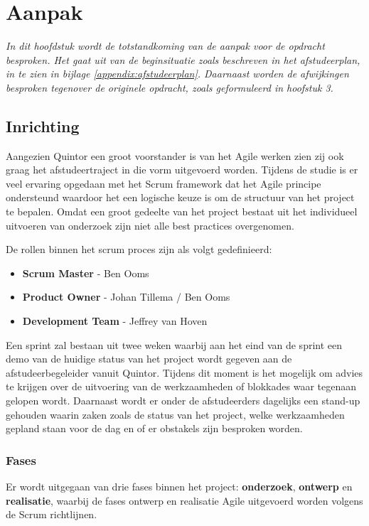 \chapter{Aanpak}
\label{Aanpak}

\textit{In dit hoofdstuk wordt de totstandkoming van de aanpak voor de opdracht besproken. Het gaat uit van de beginsituatie zoals beschreven in het afstudeerplan, in te zien in bijlage \ref{appendix:afstudeerplan}. Daarnaast worden de afwijkingen besproken tegenover de originele opdracht, zoals geformuleerd in hoofstuk 3.}

\section{Inrichting}

Aangezien Quintor een groot voorstander is van het Agile werken zien zij ook graag het afstudeertraject in die vorm uitgevoerd worden. Tijdens de studie is er veel ervaring opgedaan met het Scrum framework dat het Agile principe ondersteund waardoor het een logische keuze is om de structuur van het project te bepalen. Omdat een groot gedeelte van het project bestaat uit het individueel uitvoeren van onderzoek zijn niet alle best practices overgenomen. 

De rollen binnen het scrum proces \citep{schwaber2011scrum} zijn als volgt gedefinieerd:
\begin{itemize}[noitemsep]
  \item \textbf{Scrum Master} - Ben Ooms
  \item \textbf{Product Owner} - Johan Tillema / Ben Ooms
  \item \textbf{Development Team} - Jeffrey van Hoven
\end{itemize}

Een sprint zal bestaan uit twee weken waarbij aan het eind van de sprint een demo van de huidige status van het project wordt gegeven aan de afstudeerbegeleider vanuit Quintor. Tijdens dit moment is het mogelijk om advies te krijgen over de uitvoering van de werkzaamheden of blokkades waar tegenaan gelopen wordt. Daarnaast wordt er onder de afstudeerders dagelijks een stand-up gehouden waarin zaken zoals de status van het project, welke werkzaamheden gepland staan voor de dag en of er obstakels zijn besproken worden.
\subsection{Fases}

Er wordt uitgegaan van drie fases binnen het project: \textbf{onderzoek}, \textbf{ontwerp} en \textbf{realisatie}, waarbij de fases ontwerp en realisatie Agile uitgevoerd worden volgens de Scrum richtlijnen.

